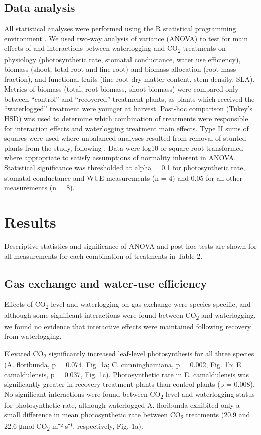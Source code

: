 \documentclass[12pt,a4paper]{memoir}
\begin{document}
\subsection*{Data analysis}
All statistical analyses were performed using the R statistical programming environment  \citep{RCoreTeam2015}. We used two-way analysis of variance (ANOVA) to test for main effects of and interactions between waterlogging and CO\textsubscript{2} treatments on physiology (photosynthetic rate, stomatal conductance, water use efficiency), biomass (shoot, total root and fine root) and biomass allocation (root mass fraction), and functional traits (fine root dry matter content, stem density, SLA). Metrics of biomass (total, root biomass, shoot biomass) were compared only between “control” and “recovered” treatment plants, as plants which received the “waterlogged” treatment were younger at harvest. Post-hoc comparison (Tukey’s HSD) was used to determine which combination of treatments were responsible for interaction effects and waterlogging treatment main effects. Type II sums of squares were used where unbalanced analyses resulted from removal of stunted plants from the study, following \citep{Lansgrud2003}. Data were log10 or square root transformed where appropriate to satisfy assumptions of normality inherent in ANOVA. Statistical significance was thresholded at alpha = 0.1 for photosynthetic rate, stomatal conductance and WUE measurements (n = 4) and 0.05 for all other measurements (n = 8).

\section{Results}
Descriptive statistics and significance of ANOVA and post-hoc tests are shown for all measurements for each combination of treatments in Table 2. 

\subsection*{Gas exchange and water-use efficiency}
Effects of CO\textsubscript{2} level and waterlogging on gas exchange were species specific, and although some significant interactions were found between CO\textsubscript{2} and waterlogging, we found no evidence that interactive effects were maintained following recovery from waterlogging. 

Elevated CO\textsubscript{2} significantly increased leaf-level photosynthesis for all three species (A. floribunda, p = 0.074, Fig. 1a; C. cunninghamiana, p = 0.002, Fig. 1b; E. camaldulensis, p = 0.037, Fig. 1c). Photosynthetic rate in E. camaldulensis was significantly greater in recovery treatment plants than control plants (p = 0.008). No significant interactions were found between CO\textsubscript{2} level and waterlogging status for photosynthetic rate, although waterlogged A. floribunda exhibited only a small difference in mean photosynthetic rate between CO\textsubscript{2} treatments (20.9 and 22.6 μmol CO\textsubscript{2} m⁻² s⁻¹, respectively, Fig. 1a).
\end{document}
